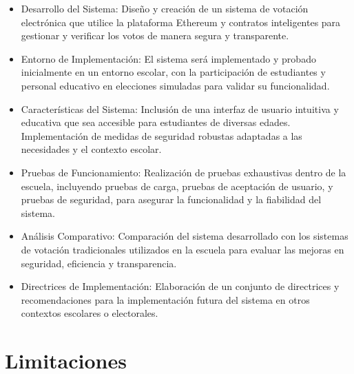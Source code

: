 \documentclass{report}
\begin{document}
	\begin{itemize}
		\item Desarrollo del Sistema: Diseño y creación de un sistema de votación electrónica que utilice la plataforma Ethereum y contratos inteligentes para gestionar y verificar los votos de manera segura y transparente.
		\item Entorno de Implementación: El sistema será implementado y probado inicialmente en un entorno escolar, con la participación de estudiantes y personal educativo en elecciones simuladas para validar su funcionalidad.
		\item Características del Sistema: Inclusión de una interfaz de usuario intuitiva y educativa que sea accesible para estudiantes de diversas edades. Implementación de medidas de seguridad robustas adaptadas a las necesidades y el contexto escolar.
		\item Pruebas de Funcionamiento: Realización de pruebas exhaustivas dentro de la escuela, incluyendo pruebas de carga, pruebas de aceptación de usuario, y pruebas de seguridad, para asegurar la funcionalidad y la fiabilidad del sistema.
		\item Análisis Comparativo: Comparación del sistema desarrollado con los sistemas de votación tradicionales utilizados en la escuela para evaluar las mejoras en seguridad, eficiencia y transparencia.
		\item Directrices de Implementación: Elaboración de un conjunto de directrices y recomendaciones para la implementación futura del sistema en otros contextos escolares o electorales.
	\end{itemize}
	
	\section{Limitaciones}
	
\end{document}

